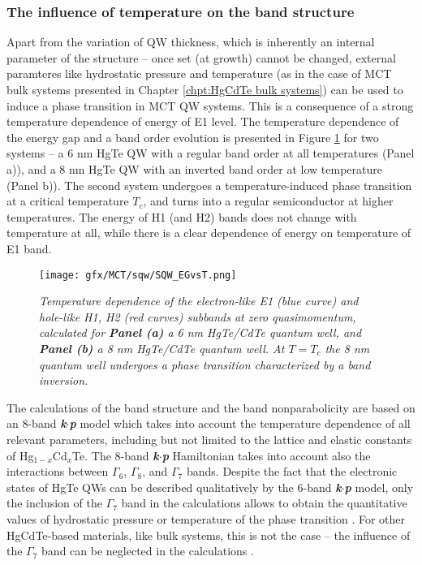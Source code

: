 \documentclass[titlepage,a4paper]{book}
\newcommand{\wciecie}{\quad\phantom{v}}
\begin{document}
\subsubsection{The influence of temperature on the band structure}
\wciecie
Apart from the variation of QW thickness, which is inherently an internal parameter of the structure -- once set (at growth) cannot be changed, external paramteres like hydrostatic pressure \cite{Krishtopenko_pressure} and temperature \cite{Wiedmann_State} (as in the case of MCT bulk systems presented in Chapter \ref{chpt:HgCdTe bulk systems}) can be used to induce a phase transition in MCT QW systems. This is a consequence of a strong temperature dependence of energy of E1 level. The temperature dependence of the energy gap and a band order evolution is presented in Figure \ref{fig:SQW_EGvsT} for two systems -- a 6 nm HgTe QW with a regular band order at all temperatures (Panel a)), and a 8 nm HgTe QW with an inverted band order at low temperature (Panel b)). The second system undergoes a temperature-induced phase transition at a critical temperature $T_c$, and turns into a regular semiconductor at higher temperatures. The energy of H1 (and H2) bands does not change with temperature at all, while there is a clear dependence of energy on temperature of E1 band.

\begin{figure}[ht]
	\centering
	\texttt{[image: gfx/MCT/sqw/SQW\_EGvsT.png]}
	\vspace{-10pt}
	\caption{\textit{Temperature dependence of the electron-like E1 (blue curve) and hole-like H1, H2 (red curves) subbands at zero quasimomentum, calculated for \textbf{Panel (a)} a 6 nm HgTe/CdTe quantum well, and \textbf{Panel (b)} a 8 nm HgTe/CdTe quantum well. At $T = T_c$ the 8 nm quantum well undergoes a phase transition characterized by a band inversion.}}
	\label{fig:SQW_EGvsT}
\end{figure} 

The calculations of the band structure and the band nonparabolicity are based on an 8-band \textbf{\textit{k$\cdot$p}} model which takes into account the temperature dependence of all relevant parameters, including but not limited to the lattice and elastic constants of Hg$_{1-x}$Cd$_x$Te. The 8-band \textbf{\textit{k$\cdot$p}} Hamiltonian takes into account also the interactions between $\Gamma_6$, $\Gamma_8$, and $\Gamma_7$ bands. Despite the fact that the electronic states of HgTe QWs can be described qualitatively by the 6-band \textbf{\textit{k$\cdot$p}} model, only the inclusion of the $\Gamma_7$ band in the calculations allows to obtain the quantitative values of hydrostatic pressure or temperature of the phase transition \cite{Krishtopenko_pressure}. For other HgCdTe-based materials, like bulk systems, this is not the case -- the influence of the $\Gamma_7$ band can be neglected in the calculations \cite{Malcolm_MCT}.
\end{document}
